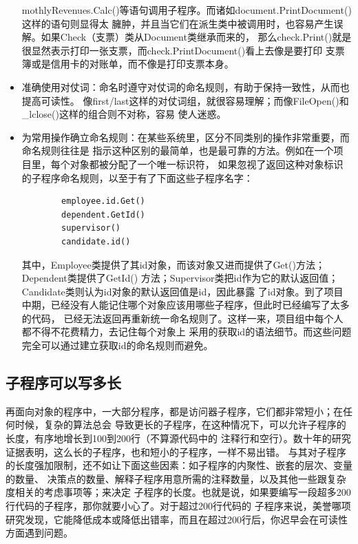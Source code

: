 \documentclass{article}
\begin{document}
\begin{itemize}
    mothlyRevenues.Calc()等语句调用子程序。而诸如document.PrintDocument()这样的语句则显得太
    臃肿，并且当它们在派生类中被调用时，也容易产生误解。如果Check（支票）类从Document类继承而来的，
    那么check.Print()就是很显然表示打印一张支票，而check.PrintDocument()看上去像是要打印
    支票簿或是信用卡的对账单，而不像是打印支票本身。
    \item 准确使用对仗词：命名时遵守对仗词的命名规则，有助于保持一致性，从而也提高可读性。
    像first/last这样的对仗词组，就很容易理解；而像FileOpen()和\_lclose()这样的组合则不对称，容易
    使人迷惑。
    \item 为常用操作确立命名规则：在某些系统里，区分不同类别的操作非常重要，而命名规则往往是
    指示这种区别的最简单，也是最可靠的方法。例如在一个项目里，每个对象都被分配了一个唯一标识符，
    如果忽视了返回这种对象标识的子程序命名规则，以至于有了下面这些子程序名字：
    \begin{lstlisting}
        employee.id.Get()
        dependent.GetId()
        supervisor()
        candidate.id()
    \end{lstlisting}
    其中，Employee类提供了其id对象，而该对象又进而提供了Get()方法；Dependent类提供了GetId()
    方法；Supervisor类把id作为它的默认返回值；Candidate类则认为id对象的默认返回值是id，因此暴露
    了id对象。到了项目中期，已经没有人能记住哪个对象应该用哪些子程序，但此时已经编写了太多的代码，
    已经无法返回再重新统一命名规则了。这样一来，项目组中每个人都不得不花费精力，去记住每个对象上
    采用的获取id的语法细节。而这些问题完全可以通过建立获取id的命名规则而避免。
\end{itemize}

\subsection{子程序可以写多长}
再面向对象的程序中，一大部分程序，都是访问器子程序，它们都非常短小；在任何时候，复杂的算法总会
导致更长的子程序，在这种情况下，可以允许子程序的长度，有序地增长到100到200行（不算源代码中的
注释行和空行）。数十年的研究证据表明，这么长的子程序，也和短小的子程序，一样不易出错。
与其对子程序的长度强加限制，还不如让下面这些因素：如子程序的内聚性、嵌套的层次、变量的数量、
决策点的数量、解释子程序用意所需的注释数量，以及其他一些跟复杂度相关的考虑事项等；来决定
子程序的长度。也就是说，如果要编写一段超多200行代码的子程序，那你就要小心了。对于超过200行代码的
子程序来说，美誉哪项研究发现，它能降低成本或降低出错率，而且在超过200行后，你迟早会在可读性
方面遇到问题。
\end{document}

